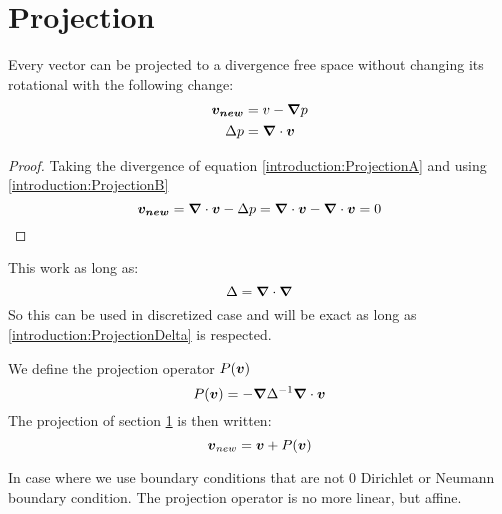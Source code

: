 \section{Projection}
\label{introduction:projection}
\begin{property}
 Every vector can be projected to a divergence free space without changing its rotational with the following change:
\begin{align}
 {\boldsymbol {v_{new}}}&=v-{\boldsymbol {\nabla}}p \label{introduction:ProjectionA}\\
 \Delta p&={\boldsymbol {\nabla}} \cdot {\boldsymbol {v}} \label{introduction:ProjectionB}
\end{align}
\end{property}
\begin{proof}
  Taking the divergence of equation \ref{introduction:ProjectionA} and using \ref{introduction:ProjectionB}
  \begin{equation}
   {\boldsymbol {v_{new}}}={\boldsymbol {\nabla}}\cdot{\boldsymbol {v}}-\Delta p={\boldsymbol {\nabla}}\cdot{\boldsymbol {v}}-{\boldsymbol {\nabla}}\cdot{\boldsymbol {v}}=0
  \end{equation}
  \end{proof}
  
  \begin{remark}
 This work as long as:
 \begin{equation}
  \Delta={\boldsymbol {\nabla}}\cdot {\boldsymbol {\nabla}}\label{introduction:ProjectionDelta}
 \end{equation}
 So this can be used in discretized case and will be exact as long as \ref{introduction:ProjectionDelta} is respected.
 \end{remark}


\begin{definition}
\label{introduction:projectiondef}
We define the projection operator $P({\boldsymbol {v}})$
  \begin{equation}
    P({\boldsymbol {v}})=-{\boldsymbol {\nabla}}\Delta^{-1}{\boldsymbol {\nabla}}\cdot {\boldsymbol {v}}
  \end{equation}
  The projection of section \ref{introduction:projection} is then written:
  \begin{equation}
    {\boldsymbol {v}}_{new}={\boldsymbol {v}}+P({\boldsymbol {v}})
  \end{equation}
\end{definition}

  In case where we use boundary conditions that are not 0 Dirichlet or Neumann boundary condition.
  The projection operator is no more linear, but affine.

